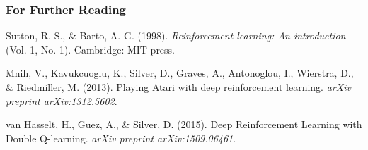\documentclass{beamer}
\begin{document}
\begin{frame}[allowframebreaks]
  \frametitle<presentation>{For Further Reading}

  \begin{thebibliography}{10}

  \beamertemplatebookbibitems

    Sutton, R. S., \& Barto, A. G. (1998). \textit{Reinforcement learning: An introduction} (Vol. 1, No. 1). Cambridge: MIT press.

  \beamertemplatearticlebibitems

    Mnih, V., Kavukcuoglu, K., Silver, D., Graves, A., Antonoglou, I., Wierstra, D., \& Riedmiller, M. (2013). Playing Atari with deep reinforcement learning. \textit{arXiv preprint arXiv:1312.5602}.

    van Hasselt, H., Guez, A., \& Silver, D. (2015). Deep Reinforcement Learning with Double Q-learning. \textit{arXiv preprint arXiv:1509.06461}.
  \end{thebibliography}
\end{frame}
\end{document}
